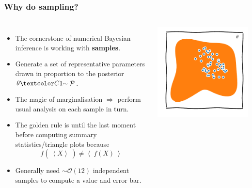 \documentclass[aspectratio=169]{beamer}
\newcommand{\av}[2][]{\left\langle #2\right\rangle_{#1}}
\begin{document}
\begin{frame}
    \frametitle{Why do sampling?}
    \begin{columns}
        \begin{itemize}
            \item The cornerstone of numerical Bayesian inference is working with \textbf{samples}.
            \item Generate a set of representative parameters drawn in proportion to the posterior $\theta\C[1]{\sim\mathcal{P}}$.
            \item The magic of marginalisation $\Rightarrow$ perform usual analysis on each sample in turn.
            \item The golden rule is  until the last moment before computing summary statistics/triangle plots because \[\boxed{f(\:\av{X}\:)\ne \av{\:f(X)\:}}\]
            \item Generally need $\sim\mathcal{O}(12)$ independent samples to compute a value and error bar.
        \end{itemize}
        \includegraphics{figures/samples.pdf}
    \end{columns}
\end{frame}
\end{document}
